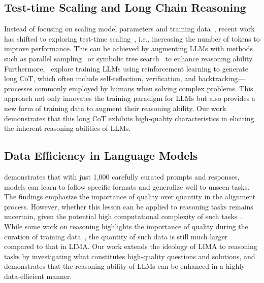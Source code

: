 \subsection{Test-time Scaling and Long Chain Reasoning}




Instead of focusing on scaling model parameters and training data~\cite{kaplan2020scalinglawsneurallanguage}, recent work has shifted to exploring test-time scaling~\cite{openai-o1,snell2024scaling}, i.e., increasing the number of tokens to improve performance. This can be achieved by augmenting LLMs with methods such as parallel sampling~\cite{brown2024largelanguagemonkeysscaling, wang2022self, Li_2022} or symbolic tree search~\cite{hao2023reasoninglanguagemodelplanning, chen2024alphamath, yao2023treethoughtsdeliberateproblem} to enhance reasoning ability. Furthermore,~\citet{openai-o1, guo2025deepseek} explore training LLMs using reinforcement learning to generate long CoT, which often include self-reflection, verification, and backtracking—processes commonly employed by humans when solving complex problems. This approach not only innovates the training paradigm for LLMs but also provides a new form of training data to augment their reasoning ability. Our work demonstrates that this long CoT exhibits high-quality characteristics in eliciting the inherent reasoning abilities of LLMs.



\subsection{Data Efficiency in Language Models}





\citet{zhou2024lima} demonstrates that with just 1,000 carefully curated prompts and responses, models can learn to follow specific formats and generalize well to unseen tasks. The findings emphasize the importance of quality over quantity in the alignment process. However, whether this lesson can be applied to reasoning tasks remains uncertain, given the potential high computational complexity of such tasks~\cite{merrill2024expressivepowertransformerschain,xiang20252reasoningllmslearning}. While some work on reasoning highlights the importance of quality during the curation of training data~\cite{zhou2024programmingexampleliftingpretraining}, the quantity of such data is still much larger compared to that in LIMA. Our work extends the ideology of LIMA to reasoning tasks by investigating what constitutes high-quality questions and solutions, and demonstrates that the reasoning ability of LLMs can be enhanced in a highly data-efficient manner.